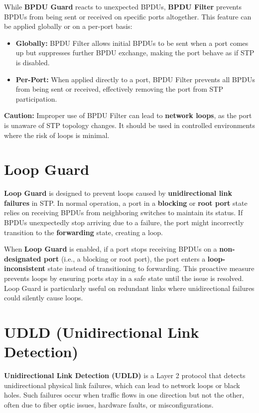 \documentclass[a4paper]{book}
\begin{document}
While \textbf{BPDU Guard} reacts to unexpected BPDUs, \textbf{BPDU Filter} prevents BPDUs from being sent or received on specific ports altogether. This feature can be applied globally or on a per-port basis:

\begin{itemize}
    \item \textbf{Globally:} BPDU Filter allows initial BPDUs to be sent when a port comes up but suppresses further BPDU exchange, making the port behave as if STP is disabled.
    \item \textbf{Per-Port:} When applied directly to a port, BPDU Filter prevents all BPDUs from being sent or received, effectively removing the port from STP participation.
\end{itemize}

\textbf{Caution:} Improper use of BPDU Filter can lead to \textbf{network loops}, as the port is unaware of STP topology changes. It should be used in controlled environments where the risk of loops is minimal.

\section*{Loop Guard}

\textbf{Loop Guard} is designed to prevent loops caused by \textbf{unidirectional link failures} in STP. In normal operation, a port in a \textbf{blocking} or \textbf{root port} state relies on receiving BPDUs from neighboring switches to maintain its status. If BPDUs unexpectedly stop arriving due to a failure, the port might incorrectly transition to the \textbf{forwarding} state, creating a loop.

When \textbf{Loop Guard} is enabled, if a port stops receiving BPDUs on a \textbf{non-designated port} (i.e., a blocking or root port), the port enters a \textbf{loop-inconsistent} state instead of transitioning to forwarding. This proactive measure prevents loops by ensuring ports stay in a safe state until the issue is resolved. Loop Guard is particularly useful on redundant links where unidirectional failures could silently cause loops.

\section*{UDLD (Unidirectional Link Detection)}

\textbf{Unidirectional Link Detection (UDLD)} is a Layer 2 protocol that detects unidirectional physical link failures, which can lead to network loops or black holes. Such failures occur when traffic flows in one direction but not the other, often due to fiber optic issues, hardware faults, or misconfigurations.
\end{document}
